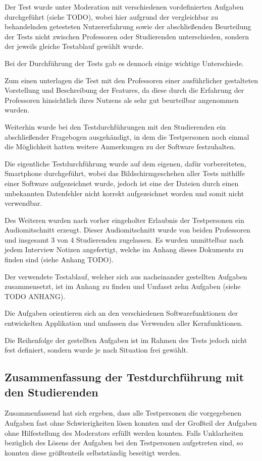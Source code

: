 \documentclass[bibliography=totoc,listof=totoc,BCOR=5mm,DIV=12,oneside]{scrbook}
\begin{document}
\par \bigskip Der Test wurde unter Moderation mit verschiedenen vordefinierten Aufgaben durchgeführt (siehe TODO), wobei hier aufgrund der vergleichbar zu behandelnden getesteten Nutzererfahrung sowie der abschließenden Beurteilung der Tests nicht zwischen Professoren oder Studierenden unterschieden, sondern der jeweils gleiche Testablauf gewählt wurde.
\par \bigskip Bei der Durchführung der Tests gab es dennoch einige wichtige Unterschiede. 
\par Zum einen unterlagen die Test mit den Professoren einer ausführlicher gestalteten Vorstellung und Beschreibung der Features, da diese durch die Erfahrung der Professoren hinsichtlich ihres Nutzens als sehr gut beurteilbar angenommen wurden.
\par Weiterhin wurde bei den Testdurchführungen mit den Studierenden ein abschließender Fragebogen ausgehändigt, in dem die Testpersonen noch einmal die Möglichkeit hatten weitere Anmerkungen zu der Software festzuhalten.

\par \bigskip Die eigentliche Testdurchführung wurde auf dem eigenen, dafür vorbereiteten, Smartphone durchgeführt, wobei das Bildschirmgeschehen aller Tests mithilfe einer Software aufgezeichnet wurde, jedoch ist eine der Dateien durch einen unbekannten Datenfehler nicht korrekt aufgezeichnet worden und somit nicht verwendbar.

\par Des Weiteren wurden nach vorher eingeholter Erlaubnis der Testpersonen ein Audiomitschnitt erzeugt. Dieser Audiomitschnitt wurde von beiden Professoren und insgesamt 3 von 4 Studierenden zugelassen. Es wurden unmittelbar nach jedem Interview Notizen angefertigt, welche im Anhang dieses Dokuments zu finden sind (siehe Anhang TODO).

\par \bigskip Der verwendete Testablauf, welcher sich aus nacheinander gestellten Aufgaben zusammensetzt, ist im Anhang zu finden und Umfasst zehn Aufgaben (siehe TODO ANHANG).
\par Die Aufgaben orientieren sich an den verschiedenen Softwarefunktionen der entwickelten Applikation und umfassen das Verwenden aller Kernfunktionen. 
\par Die Reihenfolge der gestellten Aufgaben ist im Rahmen des Tests jedoch nicht fest definiert, sondern wurde je nach Situation frei gewählt.

\newpage
\subsection{Zusammenfassung der Testdurchführung mit den Studierenden}
\par Zusammenfassend hat sich ergeben, dass alle Testpersonen die vorgegebenen Aufgaben fast ohne Schwierigkeiten lösen konnten und der Großteil der Aufgaben ohne Hilfestellung des Moderators erfüllt werden konnten. Falls Unklarheiten bezüglich des Lösens der Aufgaben bei den Testpersonen aufgetreten sind, so konnten diese größtenteils selbstständig beseitigt werden.
\end{document}

